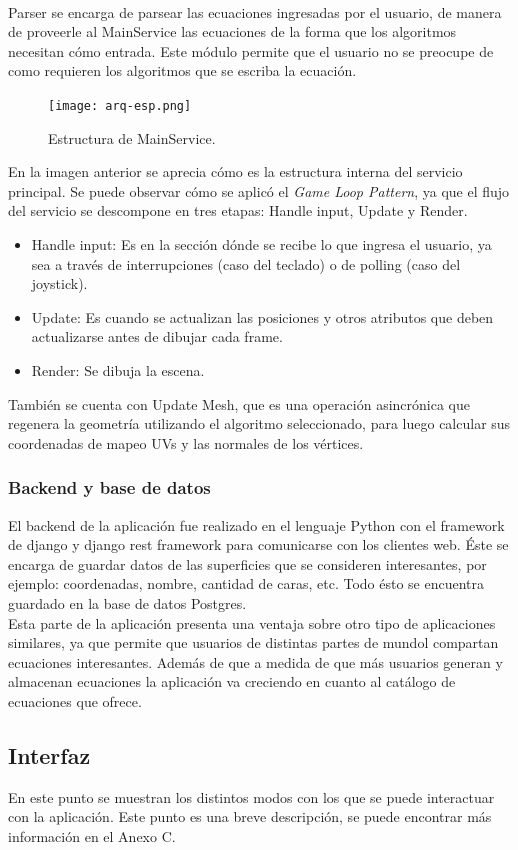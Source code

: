 \documentclass[12pt]{article}
\begin{document}
\\Parser se encarga de parsear las ecuaciones ingresadas por el usuario, de manera de proveerle al MainService las ecuaciones de la forma que los algoritmos necesitan cómo entrada. Este módulo permite que el usuario no se preocupe de como requieren los algoritmos que se escriba la ecuación.
\clearpage
\begin{figure}[h]
\texttt{[image: arq-esp.png]}
\caption{Estructura de MainService.}
\end{figure}
En la imagen anterior se aprecia cómo es la estructura interna del servicio principal. Se puede observar cómo se aplicó el \textit{Game Loop Pattern}, ya que el flujo del servicio se descompone en tres etapas: Handle input, Update y Render.
\begin{itemize}
\item Handle input: Es en la sección dónde se recibe lo que ingresa el usuario, ya sea a través de interrupciones (caso del teclado) o de polling (caso del joystick).
\item Update: Es cuando se actualizan las posiciones y otros atributos que deben actualizarse antes de dibujar cada frame.
\item Render: Se dibuja la escena.
\end{itemize}
También se cuenta con Update Mesh, que es una operación asincrónica que regenera la geometría utilizando el algoritmo seleccionado, para luego calcular sus coordenadas de mapeo UVs y las normales de los vértices.
\subsubsection{Backend y base de datos}
El backend de la aplicación fue realizado en el lenguaje Python con el framework de django y django rest framework para comunicarse con los clientes web. Éste se encarga de guardar datos de las superficies que se consideren interesantes, por ejemplo: coordenadas, nombre, cantidad de caras, etc. Todo ésto se encuentra guardado en la base de datos Postgres.
\\Esta parte de la aplicación presenta una ventaja sobre otro tipo de aplicaciones similares, ya que permite que usuarios de distintas partes de mundol compartan ecuaciones interesantes. Además de que a medida de que más usuarios generan y almacenan ecuaciones la aplicación va creciendo en cuanto al catálogo de ecuaciones que ofrece.
\clearpage
\subsection{Interfaz}
En este punto se muestran los distintos modos con los que se puede interactuar con la aplicación. Este punto es una breve descripción, se puede encontrar más información en el Anexo C.
\end{document}

